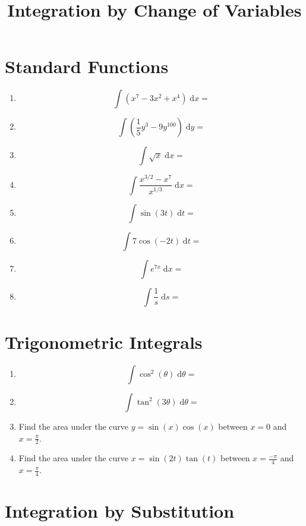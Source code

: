 \documentclass{article}
\newcommand{\diff}{\;\mathrm{d}}
\begin{document}
\title{Integration by Change of Variables}
\date{}

\maketitle
\thispagestyle{empty}

\Large



\section{Standard Functions}

\begin{enumerate}
	\item \[\int (x^7-3x^2+x^4)\diff x =\]
	\item \[\int \left(\frac{1}{5}y^3 - 9y^{100}\right)\diff y=\]
	\item \[\int \sqrt{x}\diff x =\]
	\item \[\int \frac{x^{3/2}-x^7}{x^{1/3}}\diff x =\]
	\item \[\int \sin(3t)\diff t=\]
	\item \[\int 7\cos(-2t)\diff t =\]
	\item \[\int e^{7x}\diff x =\]
	\item \[\int \frac{1}{s}\diff s =\]
\end{enumerate}


\clearpage

\section{Trigonometric Integrals}

\begin{enumerate}
	\item \[\int \cos^2(\theta)\diff \theta=\]
	\item \[\int \tan^2(3\theta)\diff \theta=\]
	\item Find the area under the curve $y=\sin(x)\cos(x)$ between $x=0$ and $x=\frac{\pi}{2}$.
	\item Find the area under the curve $x=\sin(2t)\tan(t)$ between $x=\frac{-\pi}{4}$ and $x=\frac{\pi}{4}$.
\end{enumerate}



\clearpage

\section{Integration by Substitution}
\end{document}

